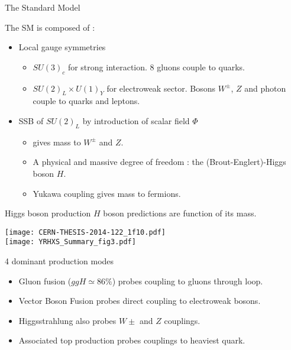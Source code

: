 \begin{frame}{The Standard Model}
  
  The SM is composed of :
  
  \begin{itemize}
  \item Local gauge symmetries
    \begin{itemize}
    \item $SU(3)_c$ for strong interaction. 8 gluons couple to quarks.
    \item $SU(2)_L\times U(1)_Y$ for electroweak sector. Bosons $W^\pm$, $Z$ and photon couple to quarks and leptons.
    \end{itemize}
    \vfill
  \item SSB of $SU(2)_L$ by introduction of scalar field $\Phi$
    \begin{itemize}
    \item gives mass to $W^\pm$ and $Z$.
    \item A physical and massive degree of freedom : the (Brout-Englert)-Higgs boson $H$.
    \item Yukawa coupling gives mass to fermions.
    \end{itemize}
  \end{itemize}
\end{frame}
\begin{frame}{Higgs boson production}
  $H$ boson predictions are function of its mass.
  
  \begin{minipage}{0.44\linewidth}
    \centering
    \texttt{[image: CERN-THESIS-2014-122\_1f10.pdf]}\\
    \texttt{[image: YRHXS\_Summary\_fig3.pdf]}
  \end{minipage}
  \hfill
  \begin{minipage}{0.55\linewidth}
    4 dominant production modes
    \begin{itemize}
    \item Gluon fusion ($ggH\simeq 86\%$) probes coupling to gluons through loop.
    \item Vector Boson Fusion probes direct coupling to electroweak bosons.
    \item Higgsstrahlung also probes $W\pm$ and $Z$ couplings.
    \item Associated top production probes couplings to heaviest quark.
    \end{itemize}
  \end{minipage}
\end{frame}

